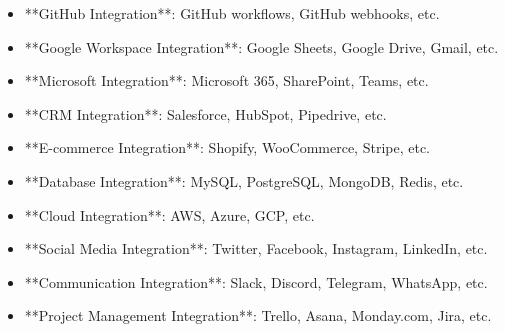 \documentclass[11pt,a4paper]{article}
\begin{document}
\begin{itemize}
\item **GitHub Integration**: GitHub workflows, GitHub webhooks, etc.
\end{itemize}

\begin{itemize}
\item **Google Workspace Integration**: Google Sheets, Google Drive, Gmail, etc.
\end{itemize}

\begin{itemize}
\item **Microsoft Integration**: Microsoft 365, SharePoint, Teams, etc.
\end{itemize}

\begin{itemize}
\item **CRM Integration**: Salesforce, HubSpot, Pipedrive, etc.
\end{itemize}

\begin{itemize}
\item **E-commerce Integration**: Shopify, WooCommerce, Stripe, etc.
\end{itemize}

\begin{itemize}
\item **Database Integration**: MySQL, PostgreSQL, MongoDB, Redis, etc.
\end{itemize}

\begin{itemize}
\item **Cloud Integration**: AWS, Azure, GCP, etc.
\end{itemize}

\begin{itemize}
\item **Social Media Integration**: Twitter, Facebook, Instagram, LinkedIn, etc.
\end{itemize}

\begin{itemize}
\item **Communication Integration**: Slack, Discord, Telegram, WhatsApp, etc.
\end{itemize}

\begin{itemize}
\item **Project Management Integration**: Trello, Asana, Monday.com, Jira, etc.
\end{itemize}
\end{document}
